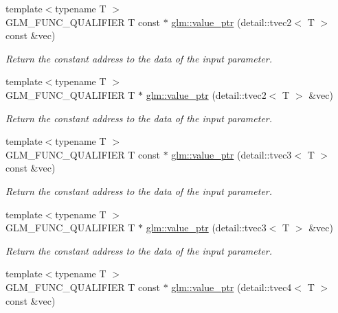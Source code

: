 \begin{DoxyCompactItemize}
\item 
{\footnotesize template$<$typename T $>$ }\\G\-L\-M\-\_\-\-F\-U\-N\-C\-\_\-\-Q\-U\-A\-L\-I\-F\-I\-E\-R T const $\ast$ \hyperlink{group__gtc__type__ptr_ga57d829c43ef1f8bbe196343744392069}{glm\-::value\-\_\-ptr} (detail\-::tvec2$<$ T $>$ const \&vec)
\begin{DoxyCompactList}\small\item\em Return the constant address to the data of the input parameter. \end{DoxyCompactList}\item 
{\footnotesize template$<$typename T $>$ }\\G\-L\-M\-\_\-\-F\-U\-N\-C\-\_\-\-Q\-U\-A\-L\-I\-F\-I\-E\-R T $\ast$ \hyperlink{group__gtc__type__ptr_ga70900f03d3f6eead08cbeb8eebe2a596}{glm\-::value\-\_\-ptr} (detail\-::tvec2$<$ T $>$ \&vec)
\begin{DoxyCompactList}\small\item\em Return the constant address to the data of the input parameter. \end{DoxyCompactList}\item 
{\footnotesize template$<$typename T $>$ }\\G\-L\-M\-\_\-\-F\-U\-N\-C\-\_\-\-Q\-U\-A\-L\-I\-F\-I\-E\-R T const $\ast$ \hyperlink{group__gtc__type__ptr_ga10a568d24db822588013d8087b67eaad}{glm\-::value\-\_\-ptr} (detail\-::tvec3$<$ T $>$ const \&vec)
\begin{DoxyCompactList}\small\item\em Return the constant address to the data of the input parameter. \end{DoxyCompactList}\item 
{\footnotesize template$<$typename T $>$ }\\G\-L\-M\-\_\-\-F\-U\-N\-C\-\_\-\-Q\-U\-A\-L\-I\-F\-I\-E\-R T $\ast$ \hyperlink{group__gtc__type__ptr_ga3dfe9e6a5ebc3beeaa3a8b35cf2ffe1d}{glm\-::value\-\_\-ptr} (detail\-::tvec3$<$ T $>$ \&vec)
\begin{DoxyCompactList}\small\item\em Return the constant address to the data of the input parameter. \end{DoxyCompactList}\item 
{\footnotesize template$<$typename T $>$ }\\G\-L\-M\-\_\-\-F\-U\-N\-C\-\_\-\-Q\-U\-A\-L\-I\-F\-I\-E\-R T const $\ast$ \hyperlink{group__gtc__type__ptr_ga75dd1f5ad6d007990c1f2cf55fe63789}{glm\-::value\-\_\-ptr} (detail\-::tvec4$<$ T $>$ const \&vec)

\end{DoxyCompactItemize}
